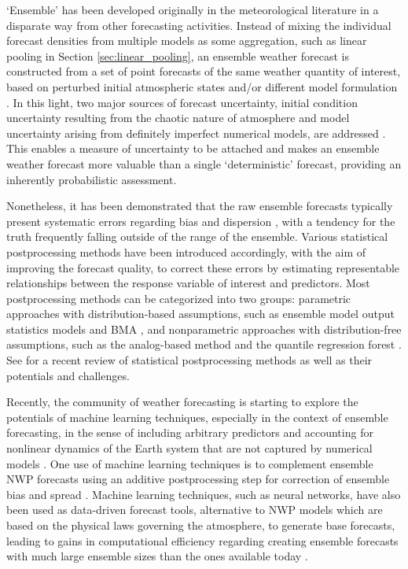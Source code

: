 \documentclass[11pt]{article}
\begin{document}
`Ensemble' has been developed originally in the meteorological literature in a disparate way from other forecasting activities. Instead of mixing the individual forecast densities from multiple models as some aggregation, such as linear pooling in Section \ref{sec:linear_pooling}, an ensemble weather forecast is constructed from a set of point forecasts of the same weather quantity of interest, based on perturbed initial atmospheric states \citep[e.g.,][]{Maqsood2004-pe,Gneiting2005-yn} and/or different model formulation \citep[e.g.,][]{Buizza1999-st,Buizza2005-wf}. In this light, two major sources of forecast uncertainty, initial condition uncertainty resulting from the chaotic nature of atmosphere and model uncertainty arising from definitely imperfect numerical models, are addressed \citep{Lorenz1963-yn,Weigel2008-vy,Baran2014-tm}. This enables a measure of uncertainty to be attached and makes an ensemble weather forecast more valuable than a single `deterministic' forecast, providing an inherently probabilistic assessment.

Nonetheless, it has been demonstrated that the raw ensemble forecasts typically present systematic errors regarding bias \citep{Atger2003-lx,Mass2003-bc} and dispersion \citep{Buizza2005-wf,Sloughter2010-ae}, with a tendency for the truth frequently falling outside of the range of the ensemble. Various statistical postprocessing methods have been introduced accordingly, with the aim of improving the forecast quality, to correct these errors by estimating representable relationships between the response variable of interest and predictors. Most postprocessing methods can be categorized into two groups: parametric approaches with distribution-based assumptions, such as ensemble model output statistics \citep[EMOS,][]{Gneiting2005-ua} models and BMA \citep{Raftery2005-xi}, and nonparametric approaches with distribution-free assumptions, such as the analog-based method \citep[e.g.,][]{Delle_Monache2013-os} and the quantile regression forest \citep{Taillardat2019-ni}. See \cite{Vannitsem2021-bg} for a recent review of statistical postprocessing methods as well as their potentials and challenges.

Recently, the community of weather forecasting is starting to explore the potentials of machine learning techniques, especially in the context of ensemble forecasting, in the sense of including arbitrary predictors and accounting for nonlinear dynamics of the Earth system that are not captured by numerical models \citep{Dueben2021-fe}. One use of machine learning techniques is to complement ensemble NWP \citep[numerical weather prediction, see, e.g.,][for a summary of its revolution]{Bauer2015-dg,Benjamin2019-zp} forecasts using an additive postprocessing step for correction of ensemble bias and spread \citep{Rasp2018-zu,Scher2018-dm,Gronquist2021-no}. Machine learning techniques, such as neural networks, have also been used as data-driven forecast tools, alternative to NWP models which are based on the physical laws governing the atmosphere, to generate base forecasts, leading to gains in computational efficiency regarding creating ensemble forecasts with much large ensemble sizes than the ones available today \citep{Dueben2018-ln,Scher2018-of,Rasp2021-az,Scher2021-ee}.
\end{document}
